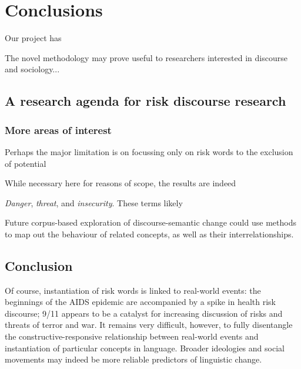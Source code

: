 
\chapter{Conclusions}

	Our project has 

	The novel methodology may prove useful to researchers interested in discourse and sociology...




\section{A research agenda for risk discourse research}









	\subsection{More areas of interest}	

	Perhaps the major limitation is on focussing only on risk words to the exclusion of potential

	While necessary here for reasons of scope, the results are indeed 

	\emph{Danger}, \emph{threat}, and \emph{insecurity}. These terms likely 

	Future corpus-based exploration of discourse-semantic change could use methods to map out the behaviour of related concepts, as well as their interrelationships.

\section{Conclusion}

	Of course, instantiation of risk words is linked to real-world events: the beginnings of the AIDS epidemic are accompanied by a spike in health risk discourse; 9\slash 11 appears to be a catalyst for increasing discussion of risks and threats of terror and war. It remains very difficult, however, to fully disentangle the constructive-responsive relationship between real-world events and instantiation of particular concepts in language. Broader ideologies and social movements may indeed be more reliable predictors of linguistic change.

	



%